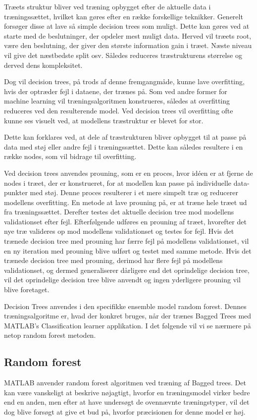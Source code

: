 Træets struktur bliver ved træning opbygget efter de aktuelle data i træningssættet, hvilket kan gøres efter en række forskellige teknikker. Generelt forsøger disse at lave så simple decision trees som muligt. Dette kan gøres ved at starte med de beslutninger, der opdeler mest muligt data. Herved vil træets root, være den beslutning, der giver den største information gain i træet. Næste niveau vil give det næstbedste split osv. Således reduceres træstrukturens størrelse og derved dens kompleksitet. 

Dog vil decision trees, på trods af denne fremgangmåde, kunne lave overfitting, hvis der optræder fejl i dataene, der trænes på. Som ved andre former for machine learning vil træningsalgoritmen konstrueres, således at overfitting reduceres ved den resulterende model. Ved decision trees vil overfitting ofte kunne ses visuelt ved, at modellens træstruktur er blevet for stor. 

Dette kan forklares ved, at dele af træstrukturen bliver opbygget til at passe på data med støj eller andre fejl i træningssættet. Dette kan således resultere i en række nodes, som vil bidrage til overfitting.

Ved decision trees anvendes prouning, som er en proces, hvor idéen er at fjerne de nodes i træet, der er konstrueret, for at modellen kan passe på individuelle data-punkter med støj. Denne proces resulterer i et mere simpelt træ og reducerer modellens overfitting. En metode at lave prouning på, er at træne hele træet ud fra træningssættet. Derefter testes det aktuelle decision tree mod modellens validationset efter fejl. Efterfølgende udføres en prouning af træet, hvorefter det nye træ valideres op mod modellens validationset og testes for fejl. Hvis det trænede decision tree med prouning har færre fejl på modellens validationset, vil en ny iteration med prouning blive udført og testet med samme metode. Hvis det trænede decision tree med prouning, derimod har flere fejl på modellens validationset, og dermed generaliserer dårligere end det oprindelige decision tree, vil det oprindelige decision tree blive anvendt og ingen yderligere prouning vil blive foretaget. 

Decision Trees anvendes i den specifikke ensemble model random forest. Dennes træningsalgoritme er, hvad der konkret bruges, når der trænes Bagged Trees med MATLAB’s Classification learner applikation. I det følgende vil vi se nærmere på netop random forest metoden.

\subsection{Random forest}
MATLAB anvender random forest algoritmen ved træning af Bagged trees. Det kan være vanskeligt at beskrive nøjagtigt, hvorfor en træningsmodel virker bedre end en anden, men efter at have undersøgt de ovennævnte træningstyper, vil det dog blive forsøgt at give et bud på, hvorfor præcisionen for denne model er høj.

